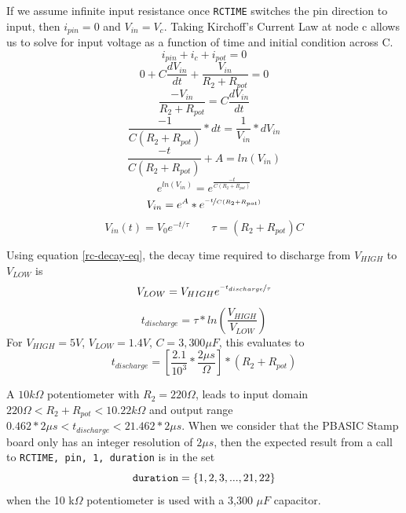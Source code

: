 \documentclass[11pt]{article}
\begin{document}
If we assume infinite input resistance once \texttt{RCTIME} switches
the pin direction to input, then $i_{pin}=0$ and $V_{in}=V_{c}$.
Taking Kirchoff's Current Law at node c allows us to solve for input
voltage as a function of time and initial condition across C.
\begin{equation*}
i_{pin}+i_{c}+i_{pot}=0
\end{equation*}
\begin{equation*}
0+C\frac{dV_{in}}{dt}+\frac{V_{in}}{R_{2}+R_{pot}}=0
\end{equation*}
\begin{equation*}
\frac{-V_{in}}{R_{2}+R_{pot}}=C\frac{dV_{in}}{dt}
\end{equation*}
\begin{equation*}
\frac{-1}{C(R_{2}+R_{pot})}*dt=\frac{1}{V_{in}}*dV_{in}
\end{equation*}
\begin{equation*}
\frac{-t}{C(R_{2}+R_{pot})}+A=ln(V_{in})
\end{equation*}
\begin{equation*}
e^{ln(V_{in})}=e^{\frac{-t}{C(R_{2}+R_{pot})}}
\end{equation*}
\begin{equation*}
V_{in}=e^{A}*e^{\nicefrac{-t}{C(R_{2}+R_{pot})}}
\end{equation*}
\begin{equation}
V_{in}(t)=V_{0}e^{-t/\tau} \quad \quad \tau=(R_{2}+R_{pot})C
\label{rc-decay-eq}
\end{equation}

Using equation \ref{rc-decay-eq}, the decay time required to discharge
from $V_{HIGH}$ to $V_{LOW}$ is
\begin{equation*}
V_{LOW}=V_{HIGH}e^{\nicefrac{-t_{discharge}}{\tau}}
\end{equation*}
\begin{equation*}
t_{discharge}=\tau*ln\left(\frac{V_{HIGH}}{V_{LOW}}\right)
\end{equation*}
For $V_{HIGH}=5V$, $V_{LOW}=1.4V$, $C=3,300\mu F$, this evaluates to
\begin{equation}
t_{discharge}=\left[\frac{2.1}{10^{3}}*\frac{2\mu s}{\Omega}\right]*(R_{2}+R_{pot})
\label{t-discharge-eq}
\end{equation}

A $10k\Omega$ potentiometer with $R_{2}=220\Omega$, leads to input
domain $220\Omega<R_{2}+R_{pot}<10.22k\Omega$ and output range
$0.462*2\mu s<t_{discharge}<21.462*2\mu s$. When we consider
that the PBASIC Stamp board only has an integer resolution of
$2 \mu s$, then the expected result from a call to
\mbox{\texttt{RCTIME, pin, 1, duration}} is in the set
\begin{equation}
\textrm{\texttt{duration}}=\{1, 2, 3,..., 21, 22\}
\end{equation}
when the 10 k$\Omega$ potentiometer is used with a 3,300 $\mu F$ capacitor.
\end{document}
